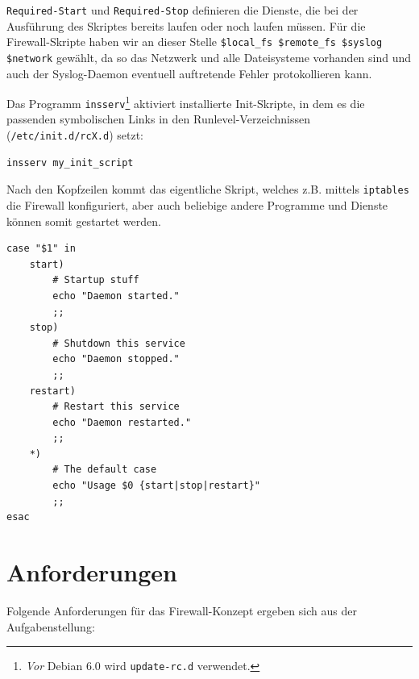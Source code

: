 {\tt Required-Start} und {\tt Required-Stop} definieren die Dienste, die bei
der Aus\-füh\-rung des Skriptes bereits laufen oder noch laufen müssen.
Für die Firewall-Skripte haben wir an dieser Stelle
\verb!$local_fs $remote_fs $syslog $network! gewählt, da so das Netzwerk und
alle Dateisysteme vorhanden sind und auch der Syslog-Daemon eventuell
auftretende Fehler protokollieren kann.

Das Programm {\tt insserv}\footnote{
\emph{Vor} Debian 6.0 wird {\tt update-rc.d} verwendet.
} aktiviert installierte Init-Skripte, in dem es die passenden symbolischen
Links in den Runlevel-Verzeichnissen ({\tt /etc/init.d/rcX.d}) setzt:

\begin{verbatim}
insserv my_init_script
\end{verbatim}

Nach den Kopfzeilen kommt das eigentliche Skript, welches z.B. mittels
{\tt iptables} die Firewall konfiguriert, aber auch beliebige andere Programme
und Dienste können somit gestartet werden.

\begin{lstlisting}[label=lst:lsb-script,caption={Init Script LSB: Eigentliches Skript.}]
case "$1" in
    start)
        # Startup stuff
        echo "Daemon started."
        ;;
    stop)
        # Shutdown this service
        echo "Daemon stopped."
        ;;
    restart)
        # Restart this service
        echo "Daemon restarted."
        ;;
    *)
        # The default case
        echo "Usage $0 {start|stop|restart}"
        ;;
esac
\end{lstlisting}


\newpage
\section{Anforderungen}

Folgende Anforderungen für das Firewall-Konzept ergeben sich aus der
Aufgabenstellung:

